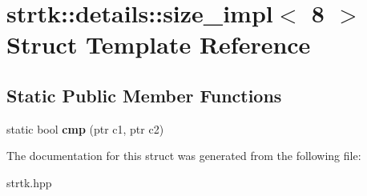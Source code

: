 \hypertarget{structstrtk_1_1details_1_1size__impl_3_018_01_4}{\section{strtk\-:\-:details\-:\-:size\-\_\-impl$<$ 8 $>$ Struct Template Reference}
\label{structstrtk_1_1details_1_1size__impl_3_018_01_4}
}
\subsection*{Static Public Member Functions}
\begin{DoxyCompactItemize}
\item 
\hypertarget{structstrtk_1_1details_1_1size__impl_3_018_01_4_af23d2659f13340415210e641afd34998}{static bool {\bfseries cmp} (ptr c1, ptr c2)}\label{structstrtk_1_1details_1_1size__impl_3_018_01_4_af23d2659f13340415210e641afd34998}

\end{DoxyCompactItemize}


The documentation for this struct was generated from the following file\-:\begin{DoxyCompactItemize}
\item 
strtk.\-hpp\end{DoxyCompactItemize}
